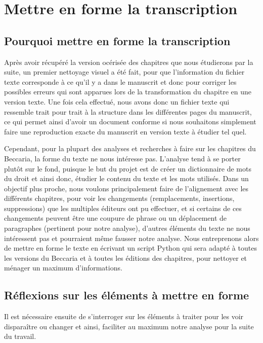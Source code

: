 
\section{Mettre en forme la transcription}
\subsection{Pourquoi mettre en forme la transcription}
Après avoir récupéré la version océrisée des chapitres que nous étudierons par la suite, un premier nettoyage visuel a été fait, pour que l'information du fichier texte corresponde à ce qu'il y a dans le manuscrit et donc pour corriger les possibles erreurs qui sont apparues lors de la transformation du chapitre en une version texte. Une fois cela effectué, nous avons donc un fichier texte qui ressemble trait pour trait à la structure dans les différentes pages du manuscrit, ce qui permet ainsi d'avoir un document conforme si nous souhaitons simplement faire une reproduction exacte du manuscrit en version texte à étudier tel quel.

Cependant, pour la plupart des analyses et recherches à faire sur les chapitres du Beccaria, la forme du texte ne nous intéresse pas. L'analyse tend à se porter plutôt sur le fond, puisque le but du projet est de créer un dictionnaire de mots du droit et ainsi donc, étudier le contenu du texte et les mots utilisés. Dans un objectif plus proche, nous voulons principalement faire de l'alignement avec les différents chapitres, pour voir les changements (remplacements, insertions, suppressions) que les multiples éditeurs ont pu effectuer, et si certains de ces changements peuvent être une coupure de phrase ou un déplacement de paragraphes (pertinent pour notre analyse), d'autres éléments du texte ne nous intéressent pas et pourraient même fausser notre analyse. Nous entreprenons alors de mettre en forme le texte en écrivant un script Python qui sera adapté à toutes les versions du Beccaria et à toutes les éditions des chapitres, pour nettoyer et ménager un maximum d'informations.

\subsection{Réflexions sur les éléments à mettre en forme}
Il est nécessaire ensuite de s'interroger sur les éléments à traiter pour les voir disparaître ou changer et ainsi, faciliter au maximum notre analyse pour la suite du travail.

